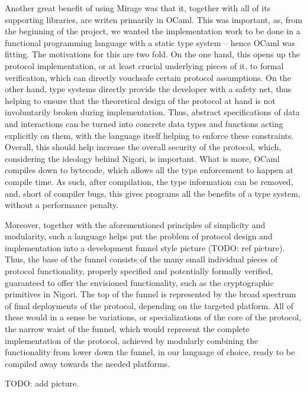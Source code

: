 Another great benefit of using Mirage was that it, together with all of its supporting libraries, are writen primarily in OCaml.
This was important, as, from the beginning of the project, we wanted the implementation work to be done in a functional programming language with a static type system -- hence OCaml was fitting.
The motivations for this are two fold.
On the one hand, this opens up the protocol implementation, or at least crucial underlying pieces of it, to formal verification, which can directly vouchsafe certain protocol assumptions.
On the other hand, type systems directly provide the developer with a safety net, thus helping to ensure that the theoretical design of the protocol at hand is not involuntarily broken during implementation.
Thus, abstract specifications of data and interactions can be turned into concrete data types and functions acting explicitly on them, with the language itself helping to enforce these constraints.
Overall, this should help increase the overall security of the protocol, which, considering the ideology behind Nigori, is important.
What is more, OCaml compiles down to bytecode, which allows all the type enforcement to happen at compile time.
As such, after compilation, the type information can be removed, and, short of compiler bugs, this gives programs all the benefits of a type system, without a performance penalty.

Moreover, together with the aforementioned principles of simplicity and modularity, such a language helps put the problem of protocol design and implementation into a development funnel style picture (TODO: ref picture).
Thus, the base of the funnel consists of the many small individual pieces of protocol functionality, properly specified and potentially formally verified, guaranteed to offer the envisioned functionality, such as the cryptographic primitives in Nigori.
The top of the funnel is represented by the broad spectrum of final deployments of the protocol, depending on the targeted platform.
All of these would in a sense be variations, or specializations of the core of the protocol, the narrow waist of the funnel, which would represent the complete implementation of the protocol, achieved by modularly combining the functionality from lower down the funnel, in our language of choice, ready to be compiled away towards the needed platforms.

TODO: add picture.

